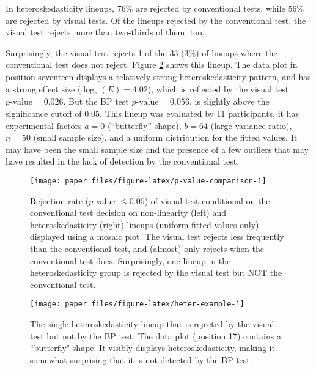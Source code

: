 \documentclass[]{interact}
\theoremstyle{plain}%
\theoremstyle{definition}
\theoremstyle{remark}
\begin{document}
In heteroskedasticity lineups, 76\% are rejected by conventional tests,
while 56\% are rejected by visual tests. Of the lineups rejected by the
conventional test, the visual test rejects more than two-thirds of them,
too.

Surprisingly, the visual test rejects 1 of the 33 (3\%) of lineups where
the conventional test does not reject. Figure \ref{fig:heter-example}
shows this lineup. The data plot in position seventeen displays a
relatively strong heteroskedasticity pattern, and has a strong effect
size (\(\log_e(E)=4.02\)), which is reflected by the visual test
\(p\text{-value} = 0.026\). But the BP test \(p\text{-value} = 0.056\),
is slightly above the significance cutoff of \(0.05\). This lineup was
evaluated by 11 participants, it has experimental factors \(a = 0\)
(``butterfly'' shape), \(b = 64\) (large variance ratio), \(n = 50\)
(small sample size), and a uniform distribution for the fitted values.
It may have been the small sample size and the presence of a few
outliers that may have resulted in the lack of detection by the
conventional test.

\begin{figure}

{\centering \texttt{[image: paper\_files/figure-latex/p-value-comparison-1]} 

}

\caption{Rejection rate ($p$-value $\leq0.05$) of visual test conditional on the conventional test decision on non-linearity (left) and heteroskedasticity (right) lineups (uniform fitted values only) displayed using a mosaic plot. The visual test rejects less frequently than the conventional test, and (almost) only rejects when the conventional test does. Surprisingly, one lineup in the heteroskedasticity group is rejected by the visual test but NOT the conventional test.}\label{fig:p-value-comparison}
\end{figure}

\begin{figure}[t!]

{\centering \texttt{[image: paper\_files/figure-latex/heter-example-1]} 

}

\caption{The single heteroskedasticity lineup that is rejected by the visual test but not by the BP test. The data plot (position 17) contains a ``butterfly" shape. It visibly displays heteroskedasticity, making it somewhat surprising that it is not detected by the BP test.}\label{fig:heter-example}
\end{figure}
\end{document}
